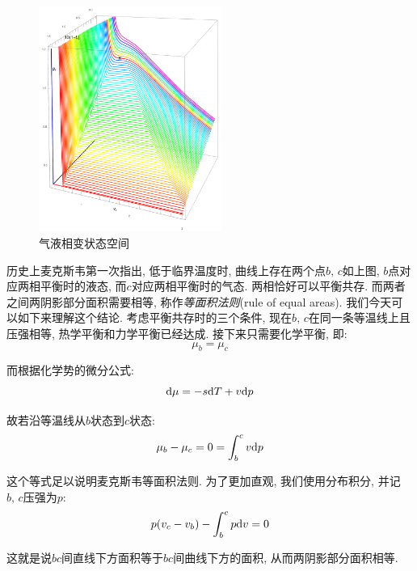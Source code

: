 \begin{figure}
\centering
\includegraphics[width=6cm]{image/5-3-9.png}
\caption{气液相变状态空间}
\end{figure}历史上麦克斯韦第一次指出, 低于临界温度时, 曲线上存在两个点$b,\,c$如上图, $b$点对应两相平衡时的液态, 而$c$对应两相平衡时的气态. 两相恰好可以平衡共存. 而两者之间两阴影部分面积需要相等, 称作\emph{等面积法则}(rule of equal areas). 我们今天可以如下来理解这个结论. 考虑平衡共存时的三个条件, 现在$b,\,c$在同一条等温线上且压强相等, 热学平衡和力学平衡已经达成. 接下来只需要化学平衡, 即:
\[\mu_b=\mu_c\]

而根据化学势的微分公式:
\[\textrm{d} \mu=-s\textrm{d} T +v\textrm{d} p\]

故若沿等温线从$b$状态到$c$状态:
\[\mu_b-\mu_c=0=\int_b^c v\textrm{d} p\]

这个等式足以说明麦克斯韦等面积法则. 为了更加直观, 我们使用分布积分, 并记$b,\,c$压强为$p$:
\[p(v_c-v_b)-\int_b^c p\textrm{d} v=0\]


这就是说$bc$间直线下方面积等于$bc$间曲线下方的面积, 从而两阴影部分面积相等.






